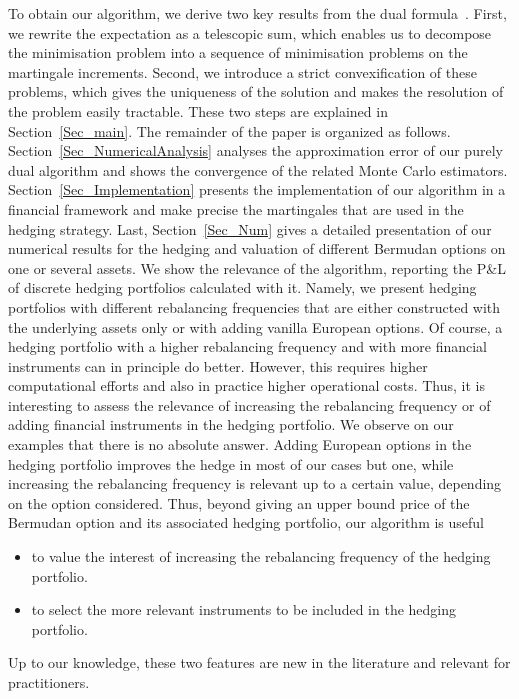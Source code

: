 To obtain our algorithm, we derive two key results from the dual formula~\cite[Theorem 2.1]{rogers-02}. First, we rewrite the expectation as a telescopic sum, which enables us to decompose the minimisation problem into a sequence of minimisation problems on the martingale increments. Second, we introduce a strict convexification of these problems, which gives the uniqueness of the solution and makes the resolution of the problem easily tractable. These two steps are explained in Section~\ref{Sec_main}. The remainder of the paper is organized as follows. Section~\ref{Sec_NumericalAnalysis} analyses the approximation error of our purely dual algorithm and shows the convergence of the related Monte Carlo estimators. Section~\ref{Sec_Implementation} presents the implementation of our algorithm in a financial framework and make precise the martingales that are used in the hedging strategy. Last, Section~\ref{Sec_Num} gives a detailed presentation of our numerical results for the hedging and valuation of different Bermudan options on one or several assets. We show the relevance of the algorithm, reporting the P\&L of discrete hedging portfolios calculated with it. Namely, we present hedging portfolios with different rebalancing frequencies that are either constructed with the underlying assets only or with adding vanilla European options. Of course, a hedging portfolio with a higher rebalancing frequency and with more financial instruments can in principle do better. However, this requires higher computational efforts and also in practice higher operational costs. Thus, it is interesting to assess the relevance of increasing the rebalancing frequency or of adding financial instruments in the hedging portfolio. We observe on our examples that there is no absolute answer. Adding European options in the hedging portfolio improves the hedge in most of our cases but one, while increasing the rebalancing frequency is relevant up to a certain value, depending on the option considered. Thus, beyond giving an upper bound price of the Bermudan option and its associated hedging portfolio, our algorithm is useful
\begin{itemize}
  \item to value the interest of increasing the rebalancing frequency of the hedging portfolio.
  \item to select the more relevant instruments to be included in the hedging portfolio.
\end{itemize} 
Up to our knowledge, these two features are new in the literature and relevant for practitioners. 


